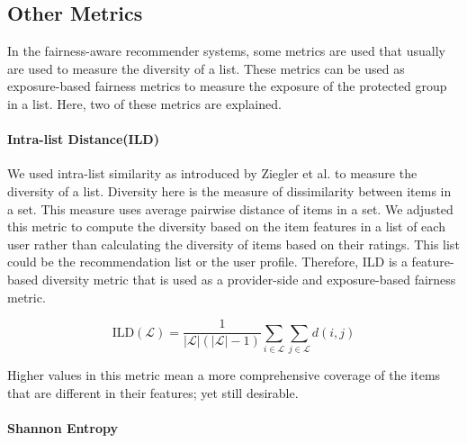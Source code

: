     \subsection{Other Metrics}
        In the fairness-aware recommender systems, some metrics are used that usually are used to measure the diversity of a list. These metrics can be used as exposure-based fairness metrics to measure the exposure of the protected group in a list. Here, two of these metrics are explained.
        
        \vspace{0.25cm}
        \noindent \paragraph{Intra-list Distance(ILD)}
        \vspace{0.25cm}

            We used intra-list similarity as introduced by Ziegler et al. \cite{ziegler2005improving} to measure the diversity of a list. Diversity here is the measure of dissimilarity between items in a set. This measure uses average pairwise distance of items in a set. We adjusted this metric to compute the diversity based on the item features in a list of each user rather than calculating the diversity of items based on their ratings. This list could be the recommendation list or the user profile. Therefore, ILD is a feature-based diversity metric that is used as a provider-side and exposure-based fairness metric.
        
            \begin{equation}
                \text{ILD}(\mathcal{L}) = \frac{1} {|\mathcal{L}|(|\mathcal{L}|-1)} \sum_{i \in \mathcal{L}}\sum_{j \in \mathcal{L}}d(i,j)
            \end{equation}
            \vspace{0.25cm}
        
            Higher values in this metric mean a more comprehensive coverage of the items that are different in their features; yet still desirable.

        \vspace{0.25cm}
        \noindent \paragraph{Shannon Entropy}
        \vspace{0.25cm}
        
